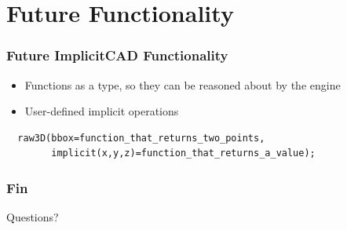 \documentclass{beamer}
\begin{document}
\section{Future Functionality}
\begin{frame}[fragile]
\frametitle{Future ImplicitCAD Functionality}
\begin{itemize}
\item Functions as a type, so they can be reasoned about by the engine
\item User-defined implicit operations
\end{itemize}
\lstset{basicstyle=\ttfamily\scriptsize}
\begin{lstlisting}
  raw3D(bbox=function_that_returns_two_points,
        implicit(x,y,z)=function_that_returns_a_value);
\end{lstlisting}
\end{frame}

\begin{frame}
\frametitle{Fin}
\Huge{\centerline{Questions?}}
\end{frame}

\end{document}
